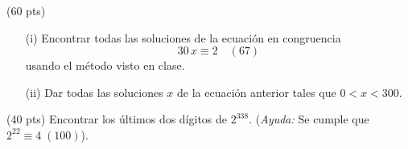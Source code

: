 \documentclass[a4paper,12pt,twoside,spanish]{amsbook}
\begin{document}


\begin{ejercicio}[1]
	
		(60 pts)
		\begin{enumerate}
			\item[(i)] Encontrar todas las soluciones de la ecuación en congruencia
			$$30\,x\equiv 2 \quad (67)$$
			usando el método visto en clase.
			\item[(ii)] Dar todas las soluciones $x$ de la ecuación anterior tales que $0 < x < 300$.
		\end{enumerate}
	\end{ejercicio}
    \begin{ejercicio}[2]
	 (40 pts)  Encontrar los últimos dos dígitos de $2^{338}$. (\textit{Ayuda:} Se cumple que $2^{22} \equiv 4 \; (100)$).
	
\end{ejercicio}
	
\end{document}
